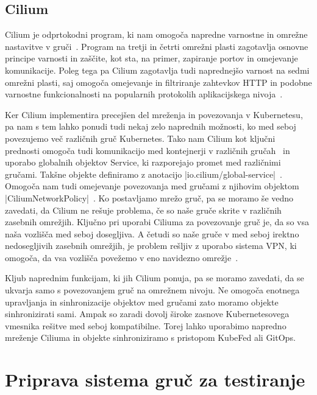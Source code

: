 \documentclass[a4paper, 12pt]{book}
\begin{document}
\section{Cilium}
Cilium je odprtokodni program, ki nam omogoča napredne varnostne in omrežne nastavitve v gruči~\cite{cilium-intro}.
Program na tretji in četrti omrežni plasti zagotavlja osnovne principe varnosti in zaščite, kot sta, na primer, zapiranje portov in omejevanje komunikacije.
Poleg tega pa Cilium zagotavlja tudi naprednejšo varnost na sedmi omrežni plasti, saj omogoča omejevanje in filtriranje zahtevkov HTTP in podobne varnostne funkcionalnosti na popularnih protokolih aplikacijskega nivoja~\cite{cilium-intro}.

Ker Cilium implementira precejšen del mreženja in povezovanja v Kubernetesu, pa nam s tem lahko ponudi tudi nekaj zelo naprednih možnosti, ko med seboj povezujemo več različnih gruč Kubernetes.
Tako nam Cilium kot ključni prednosti omogoča tudi komunikacijo med kontejnerji v različnih gručah~\cite{cilium-cluster-mesh} in uporabo globalnih objektov Service, ki razporejajo promet med različnimi gručami.
Takšne objekte definiramo z anotacijo \spverb|io.cilium/global-service|~\cite{setup-cilium-cluster-mesh}.
Omogoča nam tudi omejevanje povezovanja med gru\-ča\-mi z njihovim objektom \spverb|CiliumNetworkPolicy|~\cite{setup-cilium-cluster-mesh}.
Ko postavljamo mre\-žo gruč, pa se moramo še vedno zavedati, da Cilium ne rešuje problema, če so naše gruče skrite v različnih zasebnih omrežjih.
Ključno pri uporabi Ciliuma za povezovanje gruč je, da so vsa naša vozlišča med seboj dosegljiva.
A četudi so naše gruče v med seboj irektno nedosegljivih zasebnih omrežjih, je problem rešljiv z uporabo sistema VPN, ki omogoča, da vsa vozlišča povežemo v eno navidezno omrežje~\cite{setup-cilium-cluster-mesh}.

Kljub naprednim funkcijam, ki jih Cilium ponuja, pa se moramo zavedati, da se ukvarja samo s povezovanjem gruč na omrežnem nivoju.
Ne omogoča enotnega upravljanja in sinhronizacije objektov med gručami zato moramo objekte sinhronizirati sami.
Ampak so zaradi dovolj široke zasnove Kubernetesovega vmesnika rešitve med seboj kompatibilne.
Torej lahko uporabimo napredno mreženje Ciliuma in objekte sinhroniziramo s pristopom KubeFed ali GitOps.
\chapter{Priprava sistema gruč za testiranje}
\end{document}
